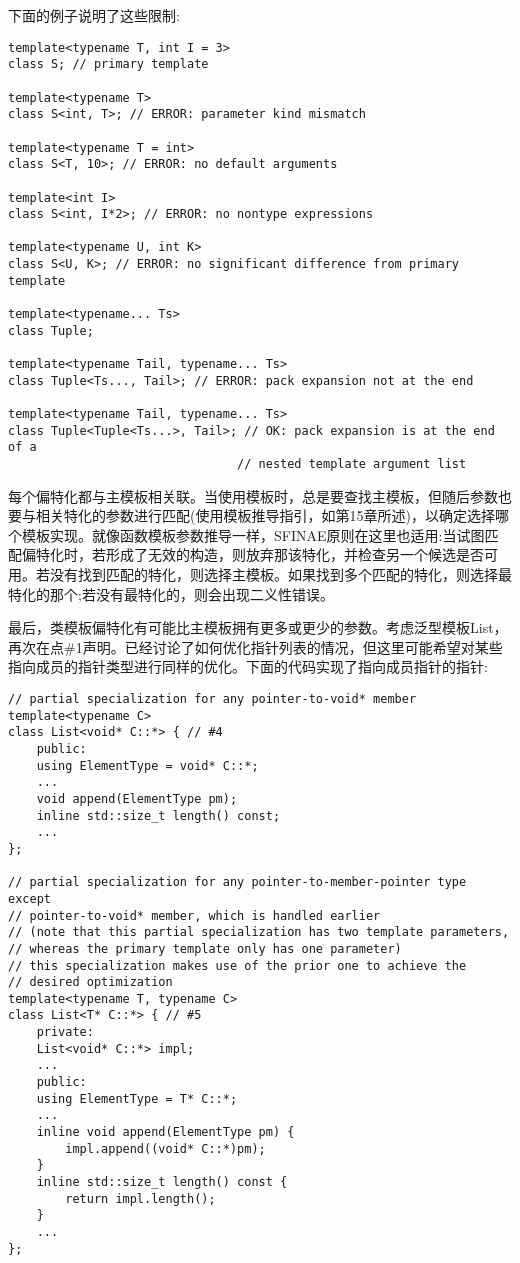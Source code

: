 下面的例子说明了这些限制:

\begin{lstlisting}[style=styleCXX]
template<typename T, int I = 3>
class S; // primary template

template<typename T>
class S<int, T>; // ERROR: parameter kind mismatch

template<typename T = int>
class S<T, 10>; // ERROR: no default arguments

template<int I>
class S<int, I*2>; // ERROR: no nontype expressions

template<typename U, int K>
class S<U, K>; // ERROR: no significant difference from primary template

template<typename... Ts>
class Tuple;

template<typename Tail, typename... Ts>
class Tuple<Ts..., Tail>; // ERROR: pack expansion not at the end

template<typename Tail, typename... Ts>
class Tuple<Tuple<Ts...>, Tail>; // OK: pack expansion is at the end of a
								// nested template argument list
\end{lstlisting}

每个偏特化都与主模板相关联。当使用模板时，总是要查找主模板，但随后参数也要与相关特化的参数进行匹配(使用模板推导指引，如第15章所述)，以确定选择哪个模板实现。就像函数模板参数推导一样，SFINAE原则在这里也适用:当试图匹配偏特化时，若形成了无效的构造，则放弃那该特化，并检查另一个候选是否可用。若没有找到匹配的特化，则选择主模板。如果找到多个匹配的特化，则选择最特化的那个;若没有最特化的，则会出现二义性错误。

最后，类模板偏特化有可能比主模板拥有更多或更少的参数。考虑泛型模板List，再次在点\#1声明。已经讨论了如何优化指针列表的情况，但这里可能希望对某些指向成员的指针类型进行同样的优化。下面的代码实现了指向成员指针的指针:

\begin{lstlisting}[style=styleCXX]
// partial specialization for any pointer-to-void* member
template<typename C>
class List<void* C::*> { // #4
	public:
	using ElementType = void* C::*;
	...
	void append(ElementType pm);
	inline std::size_t length() const;
	...
};

// partial specialization for any pointer-to-member-pointer type except
// pointer-to-void* member, which is handled earlier
// (note that this partial specialization has two template parameters,
// whereas the primary template only has one parameter)
// this specialization makes use of the prior one to achieve the
// desired optimization
template<typename T, typename C>
class List<T* C::*> { // #5
	private:
	List<void* C::*> impl;
	...
	public:
	using ElementType = T* C::*;
	...
	inline void append(ElementType pm) {
		impl.append((void* C::*)pm);
	}
	inline std::size_t length() const {
		return impl.length();
	}
	...
};
\end{lstlisting}

